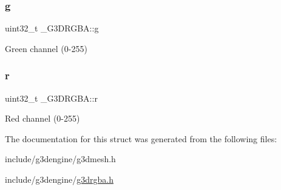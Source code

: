 \subsubsection{\texorpdfstring{g}{g}}
{\footnotesize\ttfamily uint32\+\_\+t \+\_\+\+G3\+D\+R\+G\+B\+A\+::g}

Green channel (0-\/255) \mbox{\label{struct__G3DRGBA_a0ed2188e1394cd4d06d6898b5c266d02}} 
\subsubsection{\texorpdfstring{r}{r}}
{\footnotesize\ttfamily uint32\+\_\+t \+\_\+\+G3\+D\+R\+G\+B\+A\+::r}

Red channel (0-\/255) 

The documentation for this struct was generated from the following files\+:\begin{DoxyCompactItemize}
\item 
include/g3dengine/g3dmesh.\+h\item 
include/g3dengine/\hyperlink{g3drgba_8h}{g3drgba.\+h}\end{DoxyCompactItemize}
